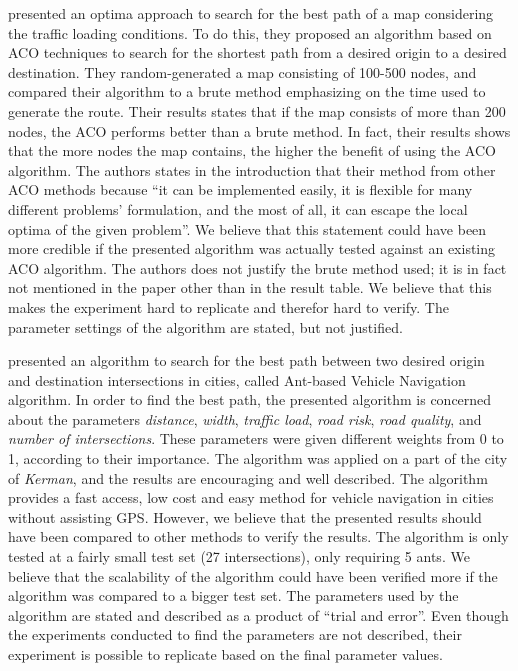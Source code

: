 \citet{hsiao04} presented an optima approach to search for the best path of a map considering the traffic loading conditions. To do this, they proposed an algorithm based on ACO techniques to search for the shortest path from a desired origin to a desired destination. They random-generated a map consisting of 100-500 nodes, and compared their algorithm to a brute method emphasizing on the time used to generate the route. Their results states that if the map consists of more than 200 nodes, the ACO performs better than a brute method. In fact, their results shows that the more nodes the map contains, the higher the benefit of using the ACO algorithm. The authors states in the introduction that their method from other ACO methods because ``it can be implemented easily, it is flexible for many different problems' formulation, and the most of all, it can escape the local optima of the given problem''. We believe that this statement could have been more credible if the presented algorithm was actually tested against an existing ACO algorithm. The authors does not justify the brute method used; it is in fact not mentioned in the paper other than in the result table. We believe that this makes the experiment hard to replicate and therefor hard to verify. The parameter settings of the algorithm are stated, but not justified.

\citet{salehi-nezhad07} presented an algorithm to search for the best path between two desired origin and destination intersections in cities, called Ant-based Vehicle Navigation algorithm. In order to find the best path, the presented algorithm is concerned about the parameters \textit{distance}, \textit{width}, \textit{traffic load}, \textit{road risk}, \textit{road quality}, and \textit{number of intersections}. These parameters were given different weights from 0 to 1, according to their importance. The algorithm was applied on a part of the city of \textit{Kerman}, and the results are encouraging and well described. The algorithm provides a fast access, low cost and easy method for vehicle navigation in cities without assisting GPS. However, we believe that the presented results should have been compared to other methods to verify the results. The algorithm is only tested at a fairly small test set (27 intersections), only requiring 5 ants. We believe that the scalability of the algorithm could have been verified more if the algorithm was compared to a bigger test set. The parameters used by the algorithm are stated and described as a product of ``trial and error''. Even though the experiments conducted to find the parameters are not described, their experiment is possible to replicate based on the final parameter values. 

